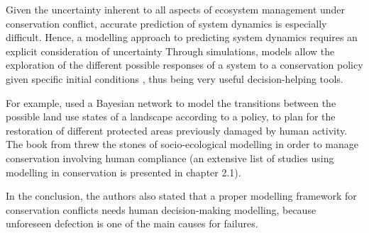 \documentclass[12pt,a4paper]{article}
\begin{document}
Given the uncertainty inherent to all aspects of ecosystem management under conservation conflict, accurate prediction of system dynamics is especially difficult.
Hence, a modelling approach to predicting system dynamics requires an explicit consideration of uncertainty
Through simulations, models allow the exploration of the different possible responses of a system to a conservation policy given specific initial conditions
, thus being very useful decision-helping tools.
%

For example, \cite{rumpff2011state} used a Bayesian network to model the transitions between the possible land use states of a landscape according to a policy, to plan for the restoration of different protected areas previously damaged by human activity.
The book from \cite{schluter2012new} threw the stones of socio-ecological modelling in order to manage conservation involving human compliance (an extensive list of studies using modelling in conservation is presented in chapter 2.1).

In the conclusion, the authors also stated that a proper modelling framework for conservation conflicts needs human decision-making modelling, because unforeseen defection is one of the main causes for failures.\\
%
\end{document}
